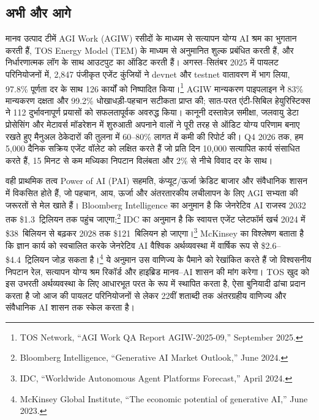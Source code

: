 \documentclass[11pt]{article}
\begin{document}
\subsection{अभी और आगे}
\begin{description}[leftmargin=2.1cm, style=nextline]
  \item[12--24 महीने] मानव उत्पाद टीमें AGI Work (AGIW) रसीदों के माध्यम से सत्यापन योग्य AI श्रम का भुगतान करती हैं, TOS Energy Model (TEM) के माध्यम से अनुमानित शुल्क प्रबंधित करती हैं, और निर्धारणात्मक लॉग के साथ आउटपुट का ऑडिट करती हैं। अगस्त--सितंबर 2025 में पायलट परिनियोजनों में, 2,847 पंजीकृत एजेंट कुंजियों ने devnet और testnet वातावरण में भाग लिया, 97.8\% पूर्णता दर के साथ 126 कार्यों को निष्पादित किया।\footnote{TOS Network, ``AGI Work QA Report AGIW-2025-09,'' September 2025.} AGIW मान्यकरण पाइपलाइन ने 83\% मान्यकरण दक्षता और 99.2\% धोखाधड़ी-पहचान सटीकता प्राप्त की; सात-परत एंटी-सिबिल हेयुरिस्टिक्स ने 112 दुर्भावनापूर्ण प्रयासों को सफलतापूर्वक अवरुद्ध किया। कानूनी दस्तावेज़ समीक्षा, जलवायु डेटा प्रोसेसिंग और मेटावर्स मॉडरेशन में शुरुआती अपनाने वालों ने पूरी तरह से ऑडिट योग्य परिणाम बनाए रखते हुए मैनुअल ठेकेदारों की तुलना में 60--80\% लागत में कमी की रिपोर्ट की। Q4 2026 तक, हम 5,000 दैनिक सक्रिय एजेंट वॉलेट को लक्षित करते हैं जो प्रति दिन 10,000 सत्यापित कार्य संसाधित करते हैं, 15 मिनट से कम मध्यिका निपटान विलंबता और 2\% से नीचे विवाद दर के साथ।

  \item[100-वर्षीय चाप] वही प्राथमिक तत्व Power of AI (PAI) सहमति, कंप्यूट/ऊर्जा क्रेडिट बाजार और संवैधानिक शासन में विकसित होते हैं, जो पहचान, आय, ऊर्जा और अंतरतारकीय लचीलापन के लिए AGI सभ्यता की जरूरतों से मेल खाते हैं। Bloomberg Intelligence का अनुमान है कि जेनरेटिव AI राजस्व 2032 तक \$1.3~ट्रिलियन तक पहुंच जाएगा;\footnote{Bloomberg Intelligence, ``Generative AI Market Outlook,'' June 2024.} IDC का अनुमान है कि स्वायत्त एजेंट प्लेटफॉर्म खर्च 2024 में \$38~बिलियन से बढ़कर 2028 तक \$121~बिलियन हो जाएगा।\footnote{IDC, ``Worldwide Autonomous Agent Platforms Forecast,'' April 2024.} McKinsey का विश्लेषण बताता है कि ज्ञान कार्य को स्वचालित करके जेनरेटिव AI वैश्विक अर्थव्यवस्था में वार्षिक रूप से \$2.6--\$4.4~ट्रिलियन जोड़ सकता है।\footnote{McKinsey Global Institute, ``The economic potential of generative AI,'' June 2023.} ये अनुमान उस वाणिज्य के पैमाने को रेखांकित करते हैं जो विश्वसनीय निपटान रेल, सत्यापन योग्य श्रम रिकॉर्ड और हाइब्रिड मानव--AI शासन की मांग करेगा। TOS खुद को इस उभरती अर्थव्यवस्था के लिए आधारभूत परत के रूप में स्थापित करता है, ऐसा बुनियादी ढांचा प्रदान करता है जो आज की पायलट परिनियोजनों से लेकर 22वीं शताब्दी तक अंतरग्रहीय वाणिज्य और संवैधानिक AI शासन तक स्केल करता है।
\end{description}
\end{document}
